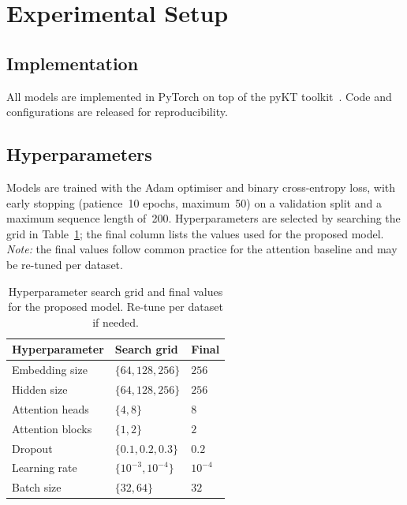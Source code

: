\section{Experimental Setup}
\label{sec:experiments}

\subsection{Implementation}
All models are implemented in PyTorch on top of the pyKT
toolkit~\cite{liu2022pykt}. Code and configurations are released for
reproducibility.

\subsection{Hyperparameters}
Models are trained with the Adam optimiser and binary cross-entropy loss,
with early stopping (patience~10 epochs, maximum~50) on a validation split
and a maximum sequence length of~200. Hyperparameters are selected by
searching the grid in Table~\ref{tab:hparams}; the final column lists the
values used for the proposed model. \emph{Note:} the final values follow
common practice for the attention baseline and may be re-tuned per dataset.

\begin{table}[t]
\caption{Hyperparameter search grid and final values for the proposed
model. Re-tune per dataset if needed.}
\label{tab:hparams}
\centering
\small
\begin{tabular}{@{}lll@{}}
\toprule
\textbf{Hyperparameter} & \textbf{Search grid} & \textbf{Final} \\
\midrule
Embedding size    & $\{64, 128, 256\}$        & $256$ \\
Hidden size       & $\{64, 128, 256\}$        & $256$ \\
Attention heads   & $\{4, 8\}$                & $8$ \\
Attention blocks  & $\{1, 2\}$                & $2$ \\
Dropout           & $\{0.1, 0.2, 0.3\}$       & $0.2$ \\
Learning rate     & $\{10^{-3}, 10^{-4}\}$    & $10^{-4}$ \\
Batch size        & $\{32, 64\}$              & $32$ \\
\bottomrule
\end{tabular}
\end{table}

